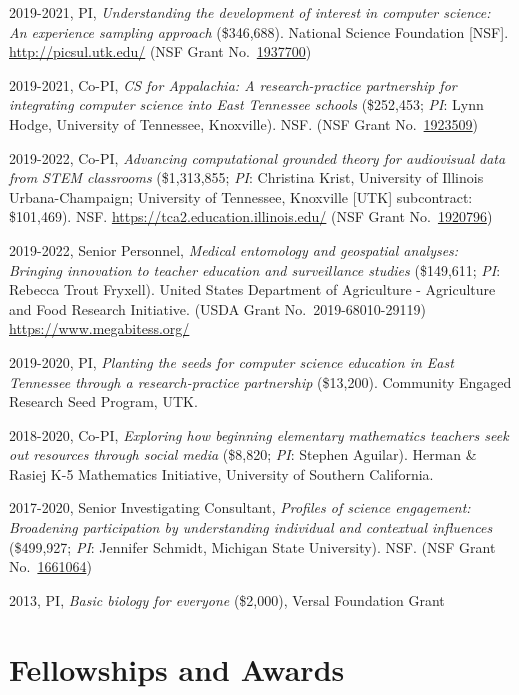 \documentclass[
  14,
]{article}
\begin{document}
2019-2021, PI, \emph{Understanding the development of interest in
computer science: An experience sampling approach} (\$346,688). National
Science Foundation {[}NSF{]}. \url{http://picsul.utk.edu/} (NSF Grant
No.~\href{https://www.nsf.gov/awardsearch/showAward?AWD_ID=1937700\&HistoricalAwards=false}{1937700})

2019-2021, Co-PI, \emph{CS for Appalachia: A research-practice
partnership for integrating computer science into East Tennessee
schools} (\$252,453; \emph{PI}: Lynn Hodge, University of Tennessee,
Knoxville). NSF. (NSF Grant
No.~\href{https://www.nsf.gov/awardsearch/showAward?AWD_ID=1923509\&HistoricalAwards=false}{1923509})

2019-2022, Co-PI, \emph{Advancing computational grounded theory for
audiovisual data from STEM classrooms} (\$1,313,855; \emph{PI}:
Christina Krist, University of Illinois Urbana-Champaign; University of
Tennessee, Knoxville {[}UTK{]} subcontract: \$101,469). NSF.
\url{https://tca2.education.illinois.edu/} (NSF Grant
No.~\href{https://www.nsf.gov/awardsearch/showAward?AWD_ID=1920796\&HistoricalAwards=false}{1920796})

2019-2022, Senior Personnel, \emph{Medical entomology and geospatial
analyses: Bringing innovation to teacher education and surveillance
studies} (\$149,611; \emph{PI}: Rebecca Trout Fryxell). United States
Department of Agriculture - Agriculture and Food Research Initiative.
(USDA Grant No.~2019-68010-29119) \url{https://www.megabitess.org/}

2019-2020, PI, \emph{Planting the seeds for computer science education
in East Tennessee through a research-practice partnership} (\$13,200).
Community Engaged Research Seed Program, UTK.

2018-2020, Co-PI, \emph{Exploring how beginning elementary mathematics
teachers seek out resources through social media} (\$8,820; \emph{PI}:
Stephen Aguilar). Herman \& Rasiej K-5 Mathematics Initiative,
University of Southern California.

2017-2020, Senior Investigating Consultant, \emph{Profiles of science
engagement: Broadening participation by understanding individual and
contextual influences} (\$499,927; \emph{PI}: Jennifer Schmidt, Michigan
State University). NSF. (NSF Grant
No.~\href{https://nsf.gov/awardsearch/showAward?AWD_ID=1661064\&HistoricalAwards=false}{1661064})

2013, PI, \emph{Basic biology for everyone} (\$2,000), Versal Foundation
Grant

\hypertarget{fellowships-and-awards}{%
\section{Fellowships and Awards}\label{fellowships-and-awards}}
\end{document}
